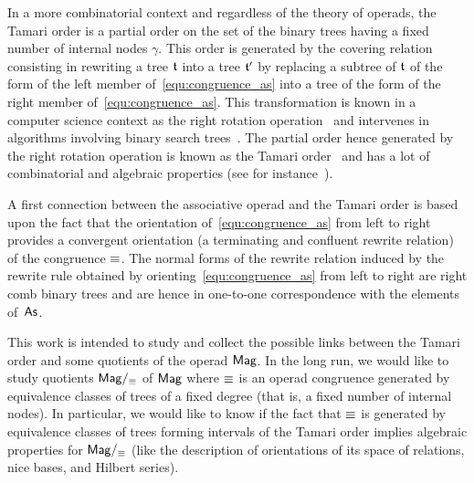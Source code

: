 In a more combinatorial context and regardless of the theory of operads,
the Tamari order is a partial order on the set of the binary trees
having a fixed number of internal nodes $\gamma$. This order is
generated by the covering relation consisting in rewriting a tree $\mathfrak{t}$
into a tree $\mathfrak{t}'$ by replacing a subtree of $\mathfrak{t}$ of the form of the
left member of~\eqref{equ:congruence_as} into a tree of the form of the
right member of~\eqref{equ:congruence_as}. This transformation is known
in a computer science context as the right rotation
operation~\cite{Knu98} and intervenes in algorithms involving binary
search trees~\cite{AVL62}. The partial order hence generated by the
right rotation operation is known as the Tamari order~\cite{Tam62} and
has a lot of combinatorial and algebraic properties (see for
instance~\cite{HT72,Cha06}).
\medbreak

A first connection between the associative operad and the Tamari order
is based upon the fact that the orientation of~\eqref{equ:congruence_as}
from left to right provides a convergent orientation (a terminating and
confluent rewrite relation) of the congruence $\operatorname{\equiv}$. The normal
forms of the rewrite relation induced by the rewrite rule obtained by
orienting~\eqref{equ:congruence_as} from left to right are right comb
binary trees and are hence in one-to-one correspondence with the
elements of~$\mathsf{As}$.
\medbreak

This work is intended to study and collect the possible links between
the Tamari order and some quotients of the operad $\mathsf{Mag}$. In the long
run, we would like to study quotients $\mathsf{Mag}/_{\operatorname{\equiv}}$ of $\mathsf{Mag}$ where
$\operatorname{\equiv}$ is an operad congruence generated by equivalence classes of
trees of a fixed degree (that is, a fixed number of internal nodes). In
particular, we would like to know if the fact that $\operatorname{\equiv}$ is generated
by equivalence classes of trees forming intervals of the Tamari order
implies algebraic properties for $\mathsf{Mag}/_{\operatorname{\equiv}}$ (like the description
of orientations of its space of relations, nice bases, and Hilbert
series).
\medbreak

